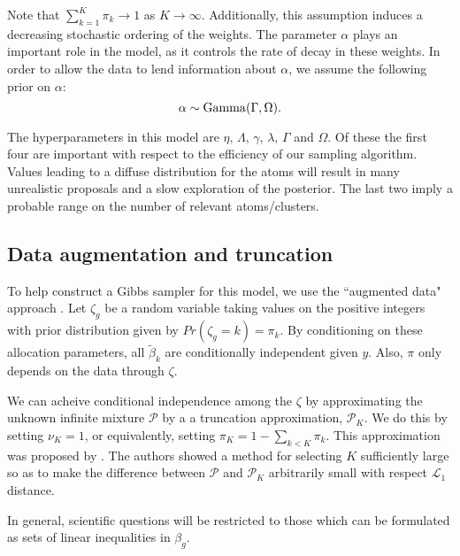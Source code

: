 Note that $\sum_{k=1}^K \pi_k \rightarrow 1$ as $K\rightarrow \infty$. Additionally, this assumption induces a decreasing stochastic ordering of the weights. The parameter $\alpha$ plays an important role in the model, as it controls the rate of decay in these weights. In order to allow the data to lend information about $\alpha$, we assume the following prior on $\alpha$:
\begin{equation}
\alpha \sim \operatorname{Gamma}(\Gamma, \Omega).
\end{equation}

The hyperparameters in this model are $\eta, \,\Lambda, \,\gamma, \,\lambda, \,\Gamma$ and $\Omega$. Of these the first four are important with respect to the efficiency of our sampling algorithm. Values leading to a diffuse distribution for the atoms will result in many unrealistic proposals and a slow exploration of the posterior. The last two imply a probable range on the number of relevant atoms/clusters.

\subsection{Data augmentation and truncation}
\label{subsec:reparam}
To help construct a Gibbs sampler for this model, we use the ``augmented data" approach \cite{tanner}. Let $\zeta_g$ be a random variable taking values on the positive integers with prior distribution given by $Pr(\zeta_g=k)=\pi_k$. By conditioning on these allocation parameters, all $\tilde{\beta}_k$ are conditionally independent given $y$. Also, $\pi$ only depends on the data through $\zeta$.

We can acheive conditional independence among the $\zeta$ by approximating the unknown infinite mixture $\mathcal{P}$ by a a truncation approximation, $\mathcal{P}_K$. We do this by setting $\nu_K=1$, or equivalently, setting $\pi_K = 1 - \sum_{k<K} \pi_k$. This approximation was proposed by \citet{ishwaran2000}. The authors showed a method for selecting $K$ sufficiently large so as to make the difference between $\mathcal{P}$ and $\mathcal{P}_K$ arbitrarily small with respect $\mathcal{L}_1$ distance. 

In general, scientific questions will be restricted to those which can be formulated as sets of linear inequalities in $\beta_g$. 

